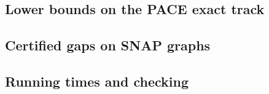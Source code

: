 \subsection{Lower bounds on the PACE exact track}\label{sec:exp-bounds}



\subsection{Certified gaps on SNAP graphs}\label{sec:exp-cert}



\subsection{Running times and checking}\label{sec:exp-time}

